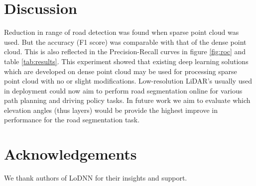 \documentclass[10pt,twocolumn,letterpaper]{article}
\begin{document}
\section{Discussion}

Reduction in range of road detection was found when sparse point cloud was used. But the accuracy (F1 score) was comparable with that of the dense point cloud. This is also reflected in the Precision-Recall curves in figure \ref{fig:roc} and table \ref{tab:results}. This experiment showed that existing deep learning solutions which are developed on dense point cloud may be used for processing sparse point cloud with no or slight modifications. Low-resolution LiDAR’s usually used in deployment could now aim to perform road segmentation online for various path planning and driving policy tasks. In future work we aim to evaluate  which elevation angles (thus layers) would be provide the highest improve in performance for the road segmentation task.

\section*{Acknowledgements}

We thank authors of LoDNN for their insights and support.

{\small


}
\end{document}
